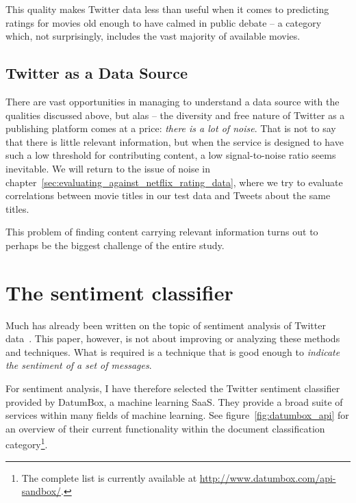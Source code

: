 This quality makes Twitter data less than useful when it comes to predicting ratings for movies old enough to have calmed in public debate -- a category which, not surprisingly, includes the vast majority of available movies.


\subsection{Twitter as a Data Source} %
\label{sub:twitter_as_a_data_source}

There are vast opportunities in managing to understand a data source with the qualities discussed above, but alas -- the diversity and free nature of Twitter as a publishing platform comes at a price: \emph{there is a lot of noise}.
That is not to say that there is little relevant information, but when the service is designed to have such a low threshold for contributing content, a low signal-to-noise ratio seems inevitable.
We will return to the issue of noise in chapter~\ref{sec:evaluating_against_netflix_rating_data}, where we try to evaluate correlations between movie titles in our test data and Tweets about the same titles.

This problem of finding content carrying relevant information turns out to perhaps be the biggest challenge of the entire study.



\section{The sentiment classifier} %
\label{sec:the_sentiment_classifier}

Much has already been written on the topic of sentiment analysis of Twitter data~\cite{go2009twitter, go2009twitterdistant, pak2010twitter, agarwal2011sentiment, kouloumpis2011twitter}. This paper, however, is not about improving or analyzing these methods and techniques. What is required is a technique that is good enough to \emph{indicate the sentiment of a set of messages}.

For sentiment analysis, I have therefore selected the Twitter sentiment classifier provided by DatumBox, a machine learning SaaS. They provide a broad suite of services within many fields of machine learning. See figure~\ref{fig:datumbox_api} for an overview of their current functionality within the document classification category\footnote{The complete list is currently available at \url{http://www.datumbox.com/api-sandbox/}.}.

